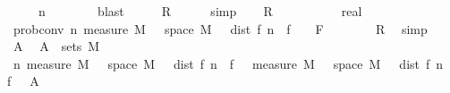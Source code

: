 \begin{isabellebody}
\ \ \ \ \ n\ {\isasymepsilon}\ \isanewline
\ \ \ \ \isamarkupfalse%
\ blast\isanewline
\ \ \isamarkupfalse%
\ \isamarkupfalse%
\ {\isacharquery}{\kern0pt}R\isanewline
\ \ \ \ \isamarkupfalse%
\ simp\isanewline
{}\isamarkupfalse%
\isanewline
\ \ \isamarkupfalse%
\ {\isacharquery}{\kern0pt}R\isanewline
\ \ \isacommand{{\isacharbraceleft}{\kern0pt}}\isamarkupfalse%
\isanewline
\ \ \ \ \isamarkupfalse%
\ {\isasymepsilon}\ {\isacharcolon}{\kern0pt}{\isacharcolon}{\kern0pt}\ real\ \isamarkupfalse%
\ {\isachardoublequoteopen}{\isasymepsilon}\ {\isachargreater}{\kern0pt}\ {}{\isachardoublequoteclose}\isanewline
\ \ \ \ \isamarkupfalse%
\ \isamarkupfalse%
\ prob{\isacharunderscore}{\kern0pt}conv{\isacharcolon}{\kern0pt}\ {\isachardoublequoteopen}{\isacharparenleft}{\kern0pt}{\isacharparenleft}{\kern0pt}{\isasymlambda}n{\isachardot}{\kern0pt}\ measure\ M\ {\isacharbraceleft}{\kern0pt}{\isasymomega}\ {\isasymin}\ space\ M{\isachardot}{\kern0pt}\ {\isasymepsilon}\ {\isacharless}{\kern0pt}\ dist\ {\isacharparenleft}{\kern0pt}f{\isacharprime}{\kern0pt}\ n\ {\isasymomega}{\isacharparenright}{\kern0pt}\ {\isacharparenleft}{\kern0pt}f\ {\isasymomega}{\isacharparenright}{\kern0pt}{\isacharbraceright}{\kern0pt}{\isacharparenright}{\kern0pt}\ {\isasymlonglongrightarrow}\ {}{\isacharparenright}{\kern0pt}\ F{\isachardoublequoteclose}\isanewline
\ \ \ \ \ \ \isamarkupfalse%
\ {\isacartoucheopen}{\isacharquery}{\kern0pt}R{\isacartoucheclose}\ \isamarkupfalse%
\ simp\isanewline
\ \ \ \ \isamarkupfalse%
\ A\ \isamarkupfalse%
\ {\isachardoublequoteopen}A\ {\isasymin}\ sets\ M{\isachardoublequoteclose}\isanewline
\ \ \ \ \isamarkupfalse%
\ {\isachardoublequoteopen}{\isasymAnd}n{\isachardot}{\kern0pt}\ measure\ M\ {\isacharparenleft}{\kern0pt}{\isacharbraceleft}{\kern0pt}{\isasymomega}\ {\isasymin}\ space\ M{\isachardot}{\kern0pt}\ {\isasymepsilon}\ {\isacharless}{\kern0pt}\ dist\ {\isacharparenleft}{\kern0pt}f{\isacharprime}{\kern0pt}\ n\ {\isasymomega}{\isacharparenright}{\kern0pt}\ {\isacharparenleft}{\kern0pt}f\ {\isasymomega}{\isacharparenright}{\kern0pt}{\isacharbraceright}{\kern0pt}{\isacharparenright}{\kern0pt}\ {\isasymge}\ measure\ M\ {\isacharparenleft}{\kern0pt}{\isacharbraceleft}{\kern0pt}{\isasymomega}\ {\isasymin}\ space\ M{\isachardot}{\kern0pt}\ {\isasymepsilon}\ {\isacharless}{\kern0pt}\ dist\ {\isacharparenleft}{\kern0pt}f{\isacharprime}{\kern0pt}\ n\ {\isasymomega}{\isacharparenright}{\kern0pt}\ {\isacharparenleft}{\kern0pt}f\ {\isasymomega}{\isacharparenright}{\kern0pt}{\isacharbraceright}{\kern0pt}\ {\isasyminter}\ A{\isacharparenright}{\kern0pt}{\isachardoublequoteclose}\isanewline

\end{isabellebody}
